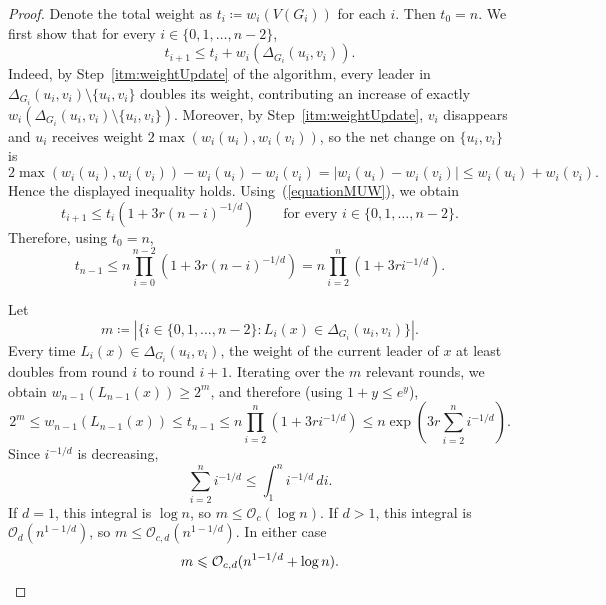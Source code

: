 \documentclass[11pt]{article}
\theoremstyle{definition}
\newcommand{\niko}[1]{\todo[color=green!40]{Niko: #1}}
\renewcommand{\leq}{\leqslant}
\renewcommand{\le}{\leqslant}
\renewcommand{\geq}{\geqslant}
\renewcommand{\cal}{\mathcal}
\begin{document}
\MWUtotal*
\begin{proof} 
    Denote the total weight as $t_i\coloneqq w_i(V(G_i))$ for each $i$. Then $t_0=n$.
    We first show that for every $i\in\{0,1,\ldots,n-2\}$,
    \[
    t_{i+1}\leq t_i+w_i(\Delta_{G_i}(u_i,v_i)).
    \]
    Indeed, by Step~\ref{itm:weightUpdate} of the algorithm, every leader in $\Delta_{G_i}(u_i,v_i)\setminus\{u_i,v_i\}$ doubles its weight, contributing an increase of exactly
    $w_i(\Delta_{G_i}(u_i,v_i)\setminus\{u_i,v_i\})$.
    Moreover, by Step~\ref{itm:weightUpdate}, $v_i$ disappears and $u_i$ receives weight $2\max(w_i(u_i),w_i(v_i))$, so the net change on $\{u_i,v_i\}$ is
    \[
    2\max(w_i(u_i),w_i(v_i))-w_i(u_i)-w_i(v_i)
    =|w_i(u_i)-w_i(v_i)|
    \leq w_i(u_i)+w_i(v_i).
    \]
    Hence the displayed inequality holds. Using~(\ref{equationMUW}), we obtain
    \[
    t_{i+1}\leq t_i\left(1+3r(n-i)^{-1/d}\right)
    \qquad\text{for every }i\in\{0,1,\ldots,n-2\}.
    \]
    Therefore, using $t_0=n$,
    \[
    t_{n-1}\leq n\prod_{i=0}^{n-2}\left(1+3r(n-i)^{-1/d}\right)
    =n\prod_{i=2}^{n}\left(1+3ri^{-1/d}\right).
    \]

    Let
    \[
    m\coloneqq\left|\bigl\{i\in\{0,1,\ldots,n-2\}: L_i(x)\in \Delta_{G_i}(u_i,v_i)\bigr\}\right|.
    \]
    Every time $L_i(x)\in \Delta_{G_i}(u_i,v_i)$, the weight of the current leader of $x$ at least doubles from round $i$ to round $i+1$.
    Iterating over the $m$ relevant rounds, we obtain \(w_{n-1}(L_{n-1}(x))\geq 2^m\), and therefore (using \(1+y\leq e^y\)),
    \[
    2^m\leq w_{n-1}(L_{n-1}(x))\leq t_{n-1}
    \leq n\prod_{i=2}^{n}\left(1+3ri^{-1/d}\right)
    \leq n\exp\left(3r\sum_{i=2}^{n} i^{-1/d}\right).
    \]
    Since $i^{-1/d}$ is decreasing,
    \[
    \sum_{i=2}^{n} i^{-1/d}\leq \int_1^n i^{-1/d}\,di.
    \]
    If $d=1$, this integral is $\log n$, so $m\le \mathcal{O}_{c}(\log n)$.
    If $d>1$, this integral is $\mathcal{O}_d(n^{1-1/d})$, so $m\le \mathcal{O}_{c,d}(n^{1-1/d})$.
    In either case
    \[
    m\leq \cal O_{c,d} (n^{1-1/d} + \log n).\qedhere
    \]
\end{proof}



\end{document}
